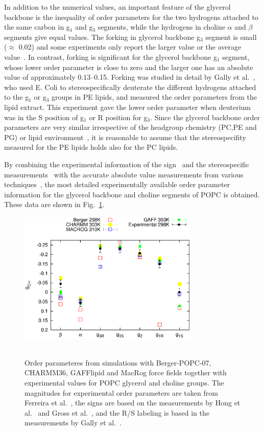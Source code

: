 \documentclass[pre,aps,floatfix,authordate1-4,twocolumn]{revtex4-1}
\begin{document}
In addition to the numerical values, an important feature of the glycerol backbone is the 
inequality of order parameters for the two hydrogens attached to the same carbon in g$_1$ and g$_3$ segments,
while the hydrogens in choline $\alpha$ and $\beta$ segments give equal values.
The forking in glycerol backbone g$_3$ segment is small ($\approx$ 0.02) 
and some experiments only report the larger value or the average value~\cite{akutsu81,ferreira13}. 
In contrast, forking is significant for the glycerol backbone g$_1$ segment, whose lower order parameter is close to zero and the
larger one has an absolute value of approximately 0.13--0.15. Forking was studied in detail by Gally et al.~\cite{gally81}, who used E. Coli to 
stereospecifically deuterate the different hydrogens attached to the g$_1$ or g$_3$ groups in PE lipids, and measured the order parameters from the lipid 
extract. This experiment gave the lower order parameter when deuterium was in the S position of g$_1$ or R position for g$_3$.
Since the glycerol backbone order parameters are very similar irrespective of the headgroup chemistry (PC,PE and PG) or lipid 
environment~\cite{gally81}, it is reasonable to assume that the stereospecifity measured for the PE lipids
holds also for the PC lipids.

By combining the experimental information of the sign~\cite{hong95a,hong95b,gross97} and the stereospecific
measurements~\cite{gally81} with the accurate absolute value measurements from various techniques~\cite{gally75,akutsu81,gross97,dvinskikh05a,ferreira13},
the most detailed experimentally available order parameter information for the glycerol backbone and choline segments of POPC is obtained.
These data are shown in Fig.~\ref{HGorderparameters2}.
\begin{figure}[]
  \centering
  \includegraphics[width=8.6cm]{HGorderparameters5.eps} \\
   \\
  \caption{\label{HGorderparameters2}
  Order parameteres from simulations with Berger-POPC-07, CHARMM36, GAFFlipid and MacRog force fields together with experimental values for POPC glycerol and choline groups.
  The magnitudes for experimental order parameters are taken from Ferreira et al.~\cite{ferreira13}, the signs are based on the measurements by Hong et al.~\cite{hong95a,hong95b} 
  and Gross et al.~\cite{gross97}, and the R/S labeling is based in the measurements by Gally et al.~\cite{gally81}.
} 
\end{figure}
\end{document}
